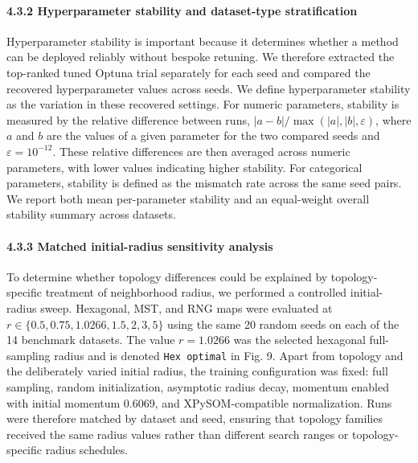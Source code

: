\documentclass[
]{article}
\providecommand{\DIFadd}[1]{{\protect\color{blue} #1}} %
\providecommand{\DIFaddbegin}{} %
\begin{document}
\paragraph{4.3.2 Hyperparameter stability and dataset-type
stratification}\label{hyperparameter-stability-and-dataset-type-stratification}

Hyperparameter stability is important because it determines whether a
method can be deployed reliably without bespoke retuning. We therefore
extracted the top-ranked tuned Optuna trial separately for each seed and
compared the recovered hyperparameter values across seeds. We define
hyperparameter stability as the variation in these recovered settings.
For numeric parameters, stability is measured by the relative difference
between runs, \(|a-b| / \max(|a|,|b|,\varepsilon)\), where \(a\) and
\(b\) are the values of a given parameter for the two compared seeds and
\(\varepsilon=10^{-12}\). These relative differences are then averaged
across numeric parameters, with lower values indicating higher
stability. For categorical parameters, stability is defined as the
mismatch rate across the same seed pairs. We report both mean
per-parameter stability and an equal-weight overall stability summary
across datasets.

\DIFaddbegin \paragraph{\DIFadd{4.3.3 Matched initial-radius sensitivity
analysis}}\label{matched-initial-radius-sensitivity-analysis}

\DIFadd{To determine whether topology differences could be explained by
topology-specific treatment of neighborhood radius, we performed a
controlled initial-radius sweep. Hexagonal, MST, and RNG maps were
evaluated at \(r\in\{0.5,0.75,1.0266,1.5,2,3,5\}\) using the same 20
random seeds on each of the 14 benchmark datasets. The value
\(r=1.0266\) was the selected hexagonal full-sampling radius and is
denoted \texttt{Hex\ optimal} in Fig. 9. Apart from topology and the
deliberately varied initial radius, the training configuration was
fixed: full sampling, random initialization, asymptotic radius decay,
momentum enabled with initial momentum 0.6069, and XPySOM-compatible
normalization. Runs were therefore matched by dataset and seed, ensuring
that topology families received the same radius values rather than
different search ranges or topology-specific radius schedules.
}
\end{document}
